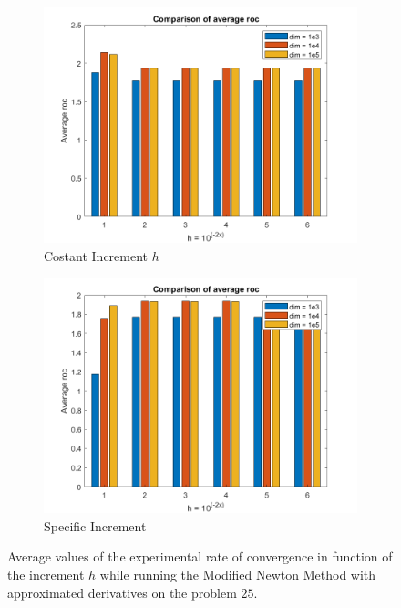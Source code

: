 \begin{figure}[htbp]
    \centering
    \begin{subfigure}[t]{0.45\textwidth}  %
        \centering
        \includegraphics[width=\textwidth]{img/pb76_MN_difffinite_COST_rateofconv.png}
        \caption{Costant Increment $h$}
    \end{subfigure}
    \hspace{1cm} %
    \begin{subfigure}[t]{0.45\textwidth}
        \centering
        \includegraphics[width=\textwidth]{img/pb76_MN_difffinite_REL_rateofconv.png}
        \caption{Specific Increment }
    \end{subfigure}
    \caption{ \small Average values of the experimental rate of convergence in function of the increment $h$  while running the Modified Newton Method with approximated derivatives on the problem $25$.}
    \label{25roc}
\end{figure}


